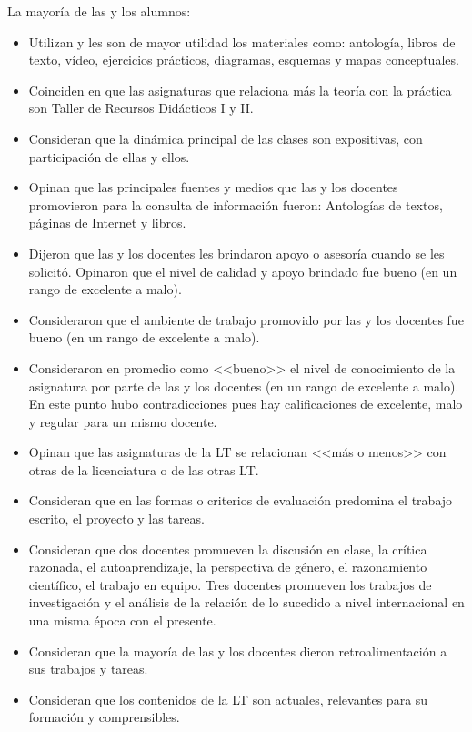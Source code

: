 \begin{center}
\begin{tiny}
\begin{longtabu*}
La mayoría de las y los alumnos: 

\begin{itemize}
\item  Utilizan y les son de mayor utilidad los materiales como:
antología, libros de texto, vídeo, ejercicios prácticos, diagramas, esquemas y mapas conceptuales. 
\item Coinciden en que las asignaturas que relaciona más la teoría con
la práctica son Taller de Recursos Didácticos I y II\@. 
\item Consideran que la dinámica principal de las clases son
expositivas, con participación de ellas y ellos. 
\item  Opinan que las principales fuentes y medios que las y los
docentes promovieron para la consulta de información fueron: Antologías de textos, páginas de Internet y libros.
\item Dijeron que las y los docentes les brindaron apoyo o asesoría
cuando se les solicitó. Opinaron que el nivel de calidad y apoyo brindado fue bueno (en un rango de excelente a malo).
\item  Consideraron que el ambiente de trabajo promovido por las y los
docentes fue bueno (en un rango de excelente a malo).
\item  Consideraron en promedio como <<bueno>> el nivel de conocimiento de
la asignatura por parte de las y los docentes (en un rango de excelente a malo). En este punto hubo contradicciones
pues hay calificaciones de excelente, malo y regular para un mismo docente. 
\item  Opinan que las asignaturas de la LT se relacionan <<más o menos>>
con otras de la licenciatura o de las otras LT\@. 
\item  Consideran que en las formas o criterios de evaluación predomina
el trabajo escrito, el proyecto y las tareas. 
\item  Consideran que dos docentes promueven la discusión en clase, la
crítica razonada, el autoaprendizaje, la perspectiva de género, el razonamiento científico, el trabajo en equipo. Tres
docentes promueven los trabajos de investigación y el análisis de la relación de lo sucedido a nivel internacional en
una misma época con el presente.
\item  Consideran que la mayoría de las y los docentes dieron
retroalimentación a sus trabajos y tareas. 
\item Consideran que los contenidos de la LT son actuales, relevantes
para su formación y comprensibles. 
\end{itemize}


\end{longtabu*}
\end{tiny}
\end{center}
